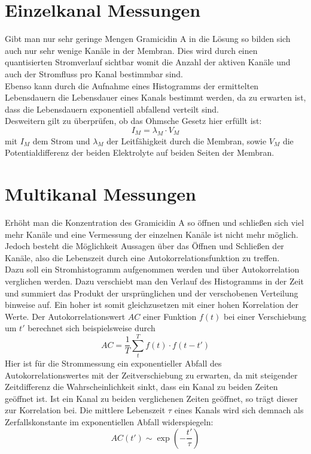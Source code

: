 \documentclass{include/thesisclass3}
\newcommand{\cc}{\cdot}
\begin{document}


\section{Einzelkanal Messungen}
Gibt man nur sehr geringe Mengen Gramicidin A in die Lösung so bilden sich auch nur sehr wenige Kanäle in der Membran. Dies wird durch einen quantisierten Stromverlauf sichtbar womit die Anzahl der aktiven Kanäle und auch der Stromfluss pro Kanal bestimmbar sind.\\
Ebenso kann durch die Aufnahme eines Histogramms der ermittelten Lebensdauern die Lebensdauer eines Kanals bestimmt werden, da zu erwarten ist, dass die Lebensdauern exponentiell abfallend verteilt sind.\\
Desweitern gilt zu überprüfen, ob das Ohmsche Gesetz hier erfüllt ist:
\[ I_M = \lambda_M \cc V_M\]
mit $I_M$ dem Strom und $\lambda_M$ der Leitfähigkeit durch die Membran, sowie $V_M$ die Potentialdifferenz der beiden Elektrolyte auf beiden Seiten der Membran.


\section{Multikanal Messungen}
Erhöht man die Konzentration des Gramicidin A so öffnen und schließen sich viel mehr Kanäle und eine Vermessung der einzelnen Kanäle ist nicht mehr möglich. Jedoch besteht die Möglichkeit Aussagen über das Öffnen und Schließen der Kanäle, also die Lebenszeit durch eine Autokorrelationsfunktion zu treffen.\\
Dazu soll ein Stromhistogramm aufgenommen werden und über Autokorrelation verglichen werden. Dazu verschiebt man den Verlauf des Histogramms in der Zeit und summiert das Produkt der ursprünglichen und der verschobenen Verteilung binweise auf. Ein hoher ist somit gleichzusetzen mit einer hohen Korrelation der Werte. Der Autokorrelationswert $AC$ einer Funktion $f(t)$ bei einer Verschiebung um $t'$ berechnet sich beispielsweise durch
\[ AC = \frac{1}{T}\sum_t^T f(t)\cc f(t-t') \]
Hier ist für die Strommessung ein exponentieller Abfall des Autokorrelationswertes mit der Zeitverschiebung zu erwarten, da mit steigender Zeitdifferenz die Wahrscheinlichkeit sinkt, dass ein Kanal zu beiden Zeiten geöffnet ist. Ist ein Kanal zu beiden verglichenen Zeiten geöffnet, so trägt dieser zur Korrelation bei. Die mittlere Lebenszeit $\tau$ eines Kanals wird sich demnach als Zerfallskonstante im exponentiellen Abfall widerspiegeln:
\[ AC(t') \sim \exp\left( - \frac{t'}{\tau}\right)\]
\end{document}
